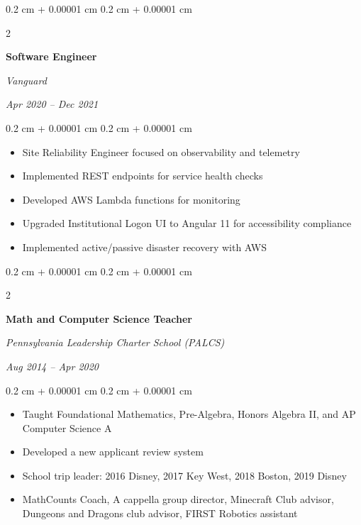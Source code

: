 \documentclass[10pt, letterpaper]{article}
\newenvironment{highlights}{
    \begin{itemize}[
        topsep=0.10 cm,
        parsep=0.10 cm,
        partopsep=0pt,
        itemsep=0pt,
        leftmargin=0.4 cm + 10pt
    ]
}{
    \end{itemize}
} %
\newenvironment{onecolentry}{
    \begin{adjustwidth}{
        0.2 cm + 0.00001 cm
    }{
        0.2 cm + 0.00001 cm
    }
}{
    \end{adjustwidth}
} %
\newenvironment{twocolentry}[2][]{
    \onecolentry
    \def\secondColumn{#2}
    \setcolumnwidth{\fill, 4.5 cm}
    \begin{paracol}{2}
}{
    \switchcolumn \raggedleft \secondColumn
    \end{paracol}
    \endonecolentry
} %
\begin{document}
        \vspace{0.2 cm}

        \begin{twocolentry}{
            
            
        \textit{Apr 2020 – Dec 2021}}
            \textbf{Software Engineer}
            
            \textit{Vanguard}
        \end{twocolentry}

        \vspace{0.10 cm}
        \begin{onecolentry}
            \begin{highlights}
                \item Site Reliability Engineer focused on observability and telemetry
                \item Implemented REST endpoints for service health checks
                \item Developed AWS Lambda functions for monitoring
                \item Upgraded Institutional Logon UI to Angular 11 for accessibility compliance
                \item Implemented active/passive disaster recovery with AWS
            \end{highlights}
        \end{onecolentry}


        \vspace{0.2 cm}

        \begin{twocolentry}{
            
            
        \textit{Aug 2014 – Apr 2020}}
            \textbf{Math and Computer Science Teacher}
            
            \textit{Pennsylvania Leadership Charter School (PALCS)}
        \end{twocolentry}

        \vspace{0.10 cm}
        \begin{onecolentry}
            \begin{highlights}
                \item Taught Foundational Mathematics, Pre-Algebra, Honors Algebra II, and AP Computer Science A
                \item Developed a new applicant review system
                \item School trip leader: 2016 Disney, 2017 Key West, 2018 Boston, 2019 Disney
                \item MathCounts Coach, A cappella group director, Minecraft Club advisor, Dungeons and Dragons club advisor, FIRST Robotics assistant
            \end{highlights}
        \end{onecolentry}
\end{document}
